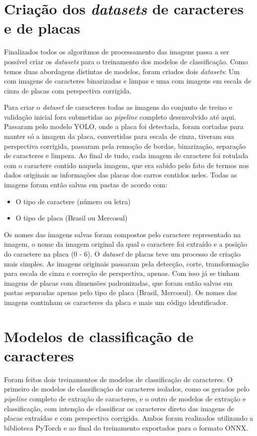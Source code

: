 \section{Criação dos \textit{datasets} de caracteres e de placas}
Finalizados todos os algoritmos de processamento das imagens passa a ser possível criar os \textit{datasets} para o treinamento dos modelos de classificação. Como temos duas abordagens distintas de modelos, foram criados dois \textit{datasets}: Um com imagens de caracteres binarizadas e limpas e uma com imagens em escala de cinza de placas com perspectiva corrigida.

Para criar o \textit{dataset} de caracteres todas as imagens do conjunto de treino e validação inicial fora submetidas ao \textit{pipeline} completo desenvolvido até aqui. Passaram pelo modelo YOLO, onde a placa foi detectada, foram cortadas para manter só a imagem da placa, convertidas para escala de cinza, tiveram sua perspectiva corrigida, passaram pela remoção de bordas, binarização, separação de caracteres e limpeza. Ao final de tudo, cada imagem de caractere foi rotulada com o caractere contido naquela imagem, que era sabido pelo fato de termos nos dados originais as informações das placas dos carros contidos neles. Todas as imagens foram então salvas em pastas de acordo com:
\begin{itemize} 
\item O tipo de caractere (número ou letra) 
\item O tipo de placa (Brasil ou Mercosul) 
\end{itemize}

Os nomes das imagens salvas foram compostos pelo caractere representado na imagem, o nome da imagem original da qual o caractere foi extraído e a posição do caractere na placa (0 - 6).
O \textit{dataset} de placas teve um processo de criação mais simples. As imagens originais passaram pela detecção, corte, transformação para escala de cinza e correção de perspectiva, apenas. Com isso já se tinham imagens de placas com dimensões padronizadas, que foram então salvas em pastas separadas apenas pelo tipo de placa (Brasil, Mercosul). Os nomes das imagens continham os caracteres da placa e mais um código identificador.

\section{Modelos de classificação de caracteres}
Foram feitos dois treinamentos de modelos de classificação de caracteres. O primeiro de modelos de classificação de caracteres isolados, como os gerados pelo \textit{pipeline} completo de extração de caracteres, e o outro de modelos de extração e classificação, com intenção de classificar os caracteres direto das imagens de placas extraídas e com perspectiva corrigida. Ambos foram realizados utilizando a biblioteca PyTorch e ao final do treinamento exportados para o formato ONNX.

